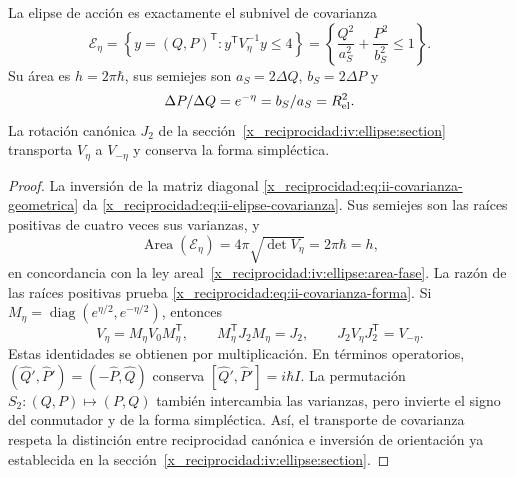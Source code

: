 \begin{proposition}
\label{x_reciprocidad:prop:ii-area-covarianza-reciprocidad}
La elipse de acción es exactamente el subnivel de covarianza
\begin{equation}
 \mathcal E_\eta
 =\left\{y=(Q,P)^{\mathsf T}:y^{\mathsf T}V_\eta^{-1}y\leq4\right\}
 =\left\{\frac{Q^2}{a_S^2}+\frac{P^2}{b_S^2}\leq1\right\}.
 \label{x_reciprocidad:eq:ii-elipse-covarianza}
\end{equation}
Su área es \(h=2\pi\hbar\), sus semiejes son
\(a_S=2\Delta Q\), \(b_S=2\Delta P\) y
\begin{equation}
 \frac{\Delta P}{\Delta Q}=e^{-\eta}
 =\frac{b_S}{a_S}=R_{\rm el}^2.
 \label{x_reciprocidad:eq:ii-covarianza-forma}
\end{equation}
La rotación canónica \(J_2\) de la sección~\ref{x_reciprocidad:iv:ellipse:section} transporta
\(V_\eta\) a \(V_{-\eta}\) y conserva la forma simpléctica.
\end{proposition}

\begin{proof}
La inversión de la matriz diagonal
\eqref{x_reciprocidad:eq:ii-covarianza-geometrica} da
\eqref{x_reciprocidad:eq:ii-elipse-covarianza}. Sus semiejes son las raíces positivas de
cuatro veces sus varianzas, y
\[
 \operatorname{Area}(\mathcal E_\eta)
 =4\pi\sqrt{\det V_\eta}=2\pi\hbar=h,
\]
en concordancia con la ley areal~\eqref{x_reciprocidad:iv:ellipse:area-fase}.
La razón de las raíces positivas prueba
\eqref{x_reciprocidad:eq:ii-covarianza-forma}.
Si \(M_\eta=\operatorname{diag}(e^{\eta/2},e^{-\eta/2})\), entonces
\[
 V_\eta=M_\eta V_0M_\eta^{\mathsf T},\qquad
 M_\eta^{\mathsf T}J_2M_\eta=J_2,\qquad
 J_2V_\eta J_2^{\mathsf T}=V_{-\eta}.
\]
Estas identidades se obtienen por multiplicación. En términos operatorios,
\((\widehat Q',\widehat P')=(-\widehat P,\widehat Q)\) conserva
\([\widehat Q',\widehat P']=i\hbar I\). La permutación
\(S_2:(Q,P)\mapsto(P,Q)\) también intercambia las varianzas, pero invierte
el signo del conmutador y de la forma simpléctica. Así, el transporte de
covarianza respeta la distinción entre reciprocidad canónica e inversión
de orientación ya establecida en la sección~\ref{x_reciprocidad:iv:ellipse:section}.
\end{proof}

